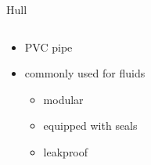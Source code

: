 \documentclass{beamer}
\begin{document}
	\begin{frame}[t]{Hull}
		\begin{columns}[T]
			\begin{column}{0.5\textwidth}
				\begin{minipage}{\textwidth}
					\resizebox{0.9\textwidth}{!}{}
				\end{minipage}
				\begin{minipage}{\textwidth}
					\vspace{0.5cm}
					\begin{itemize}
						\item PVC pipe
						\item commonly used for fluids
							\begin{itemize}
								\item modular
								\item equipped with seals
								\item leakproof
							\end{itemize}
					\end{itemize}
				\end{minipage}
			\end{column}
			\begin{column}{0.5\textwidth}
				\begin{center}

\end{center}
\end{column}
\end{columns}
\end{frame}
\end{document}
